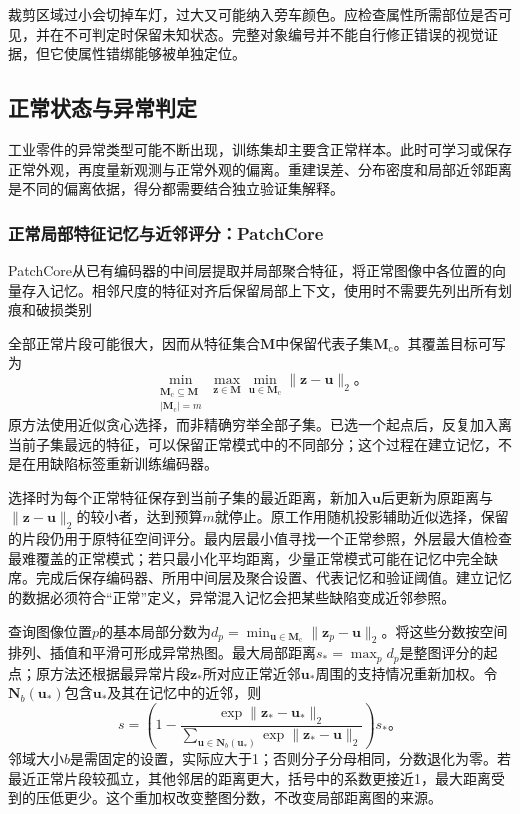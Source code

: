 裁剪区域过小会切掉车灯，过大又可能纳入旁车颜色。应检查属性所需部位是否可见，并在不可判定时保留未知状态。完整对象编号并不能自行修正错误的视觉证据，但它使属性错绑能够被单独定位。

\subsection{正常状态与异常判定}
\label{sec:vision-recognition-anomaly}

工业零件的异常类型可能不断出现，训练集却主要含正常样本。此时可学习或保存正常外观，再度量新观测与正常外观的偏离。重建误差、分布密度和局部近邻距离是不同的偏离依据，得分都需要结合独立验证集解释。

\subsubsection{正常局部特征记忆与近邻评分：PatchCore}
\label{sec:vision-recognition-patchcore}

PatchCore从已有编码器的中间层提取并局部聚合特征，将正常图像中各位置的向量存入记忆。相邻尺度的特征对齐后保留局部上下文，使用时不需要先列出所有划痕和破损类别

全部正常片段可能很大，因而从特征集合$\bm{M}$中保留代表子集$\bm{M}_{\mathrm{c}}$。其覆盖目标可写为
\begin{equation}
 \min_{\substack{\bm{M}_{\mathrm{c}}\subseteq\bm{M}\\
 |\bm{M}_{\mathrm{c}}|=m}}
 \max_{\bm{z}\in\bm{M}}\min_{\bm{u}\in\bm{M}_{\mathrm{c}}}
 \lVert\bm{z}-\bm{u}\rVert_2\text{。}
 \label{eq:vision-patchcore-coreset}
\end{equation}
原方法使用近似贪心选择，而非精确穷举全部子集。已选一个起点后，反复加入离当前子集最远的特征，可以保留正常模式中的不同部分；这个过程在建立记忆，不是在用缺陷标签重新训练编码器。

选择时为每个正常特征保存到当前子集的最近距离，新加入$\bm{u}$后更新为原距离与$\lVert\bm{z}-\bm{u}\rVert_2$的较小者，达到预算$m$就停止。原工作用随机投影辅助近似选择，保留的片段仍用于原特征空间评分。最内层最小值寻找一个正常参照，外层最大值检查最难覆盖的正常模式；若只最小化平均距离，少量正常模式可能在记忆中完全缺席。完成后保存编码器、所用中间层及聚合设置、代表记忆和验证阈值。建立记忆的数据必须符合“正常”定义，异常混入记忆会把某些缺陷变成近邻参照。

查询图像位置$p$的基本局部分数为$d_p=\min_{\bm{u}\in\bm{M}_{\mathrm{c}}}\lVert\bm{z}_p-\bm{u}\rVert_2$。将这些分数按空间排列、插值和平滑可形成异常热图。最大局部距离$s_*=\max_p d_p$是整图评分的起点；原方法还根据最异常片段$\bm{z}_*$所对应正常近邻$\bm{u}_*$周围的支持情况重新加权。令$\bm{N}_b(\bm{u}_*)$包含$\bm{u}_*$及其在记忆中的近邻，则
\begin{equation}
 s=\left(1-
 \frac{\exp\lVert\bm{z}_*-\bm{u}_*\rVert_2}
 {\sum_{\bm{u}\in\bm{N}_b(\bm{u}_*)}
  \exp\lVert\bm{z}_*-\bm{u}\rVert_2}\right)s_*\text{。}
 \label{eq:vision-patchcore-score}
\end{equation}
邻域大小$b$是需固定的设置，实际应大于1；否则分子分母相同，分数退化为零。若最近正常片段较孤立，其他邻居的距离更大，括号中的系数更接近1，最大距离受到的压低更少。这个重加权改变整图分数，不改变局部距离图的来源。

